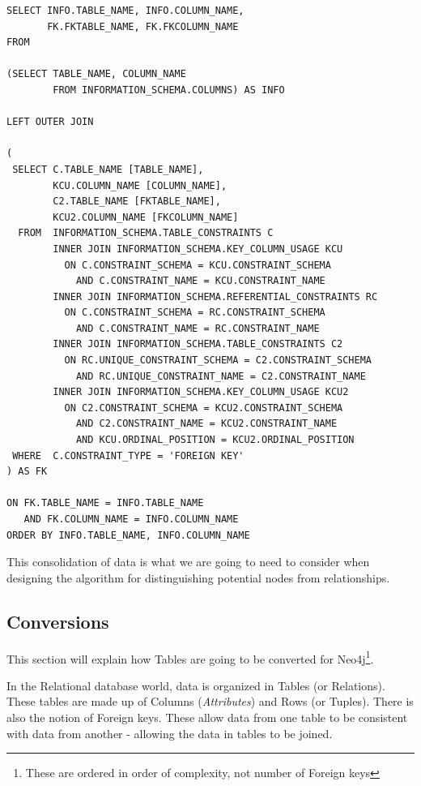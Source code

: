 \documentclass{acm_proc_article-sp}
\begin{document}
\begin{lstlisting}[frame=single,breaklines=true]
SELECT INFO.TABLE_NAME, INFO.COLUMN_NAME, 
       FK.FKTABLE_NAME, FK.FKCOLUMN_NAME 
FROM

(SELECT TABLE_NAME, COLUMN_NAME
        FROM INFORMATION_SCHEMA.COLUMNS) AS INFO

LEFT OUTER JOIN

(
 SELECT C.TABLE_NAME [TABLE_NAME], 
        KCU.COLUMN_NAME [COLUMN_NAME],
        C2.TABLE_NAME [FKTABLE_NAME], 
        KCU2.COLUMN_NAME [FKCOLUMN_NAME]
  FROM  INFORMATION_SCHEMA.TABLE_CONSTRAINTS C 
        INNER JOIN INFORMATION_SCHEMA.KEY_COLUMN_USAGE KCU 
          ON C.CONSTRAINT_SCHEMA = KCU.CONSTRAINT_SCHEMA 
            AND C.CONSTRAINT_NAME = KCU.CONSTRAINT_NAME 
        INNER JOIN INFORMATION_SCHEMA.REFERENTIAL_CONSTRAINTS RC 
          ON C.CONSTRAINT_SCHEMA = RC.CONSTRAINT_SCHEMA 
            AND C.CONSTRAINT_NAME = RC.CONSTRAINT_NAME 
        INNER JOIN INFORMATION_SCHEMA.TABLE_CONSTRAINTS C2 
          ON RC.UNIQUE_CONSTRAINT_SCHEMA = C2.CONSTRAINT_SCHEMA 
            AND RC.UNIQUE_CONSTRAINT_NAME = C2.CONSTRAINT_NAME 
        INNER JOIN INFORMATION_SCHEMA.KEY_COLUMN_USAGE KCU2 
          ON C2.CONSTRAINT_SCHEMA = KCU2.CONSTRAINT_SCHEMA 
            AND C2.CONSTRAINT_NAME = KCU2.CONSTRAINT_NAME 
            AND KCU.ORDINAL_POSITION = KCU2.ORDINAL_POSITION 
 WHERE  C.CONSTRAINT_TYPE = 'FOREIGN KEY'
) AS FK

ON FK.TABLE_NAME = INFO.TABLE_NAME
   AND FK.COLUMN_NAME = INFO.COLUMN_NAME
ORDER BY INFO.TABLE_NAME, INFO.COLUMN_NAME
\end{lstlisting}

This consolidation of data is what we are going to need to consider when
designing the algorithm for distinguishing potential nodes from relationships.

\subsection{Conversions}

This section will explain how Tables are going to be converted for 
Neo4j\footnote{These are ordered in order of complexity, not number of
Foreign keys}.

In the Relational database world, data is organized in Tables (or Relations). These tables are made up of Columns (\textit{Attributes}) and Rows (or Tuples). There is also the notion of Foreign keys. These allow data from one table to be consistent with data from another - allowing the data in tables to be joined.
\end{document}
